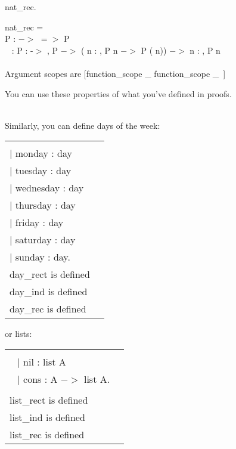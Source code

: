 \begin{code}	 nat\_rec.		\end{code}
\begin{msg}	
	nat\_rec = 								\\
	 P :  $->$  $=>$  P				\\ \-\ \qquad
		:  P :  -$>$ ,					
		  P  $->$						
       			( n : , P n $->$ P ( n)) $->$  n : , P n 
	\\ \\
	Argument scopes are [function\_scope \_ function\_scope \_\ ]
\end{msg}

\noindent
You can use these properties of what you've defined in proofs.

~\\
\noindent
Similarly, you can define days of the week:

\hspace{-1cm}
\begin{tabular}{p{8cm} p{8cm}}
\begin{code}
\Inductive \nm{day}: \Type :=	\\ \-\quad
 $\mid$ monday : day		\\ \-\quad
 $\mid$ tuesday : day		\\ \-\quad
 $\mid$ wednesday : day		\\ \-\quad
 $\mid$ thursday : day		\\ \-\quad
 $\mid$ friday : day			\\ \-\quad
 $\mid$ saturday : day		\\ \-\quad
 $\mid$ sunday : day.
\end{code}
&
\begin{msg}			
day is defined			\\
day\_rect is defined		\\
day\_ind is defined		\\
day\_rec is defined		
\end{msg}
\end{tabular}

\noindent
or lists:

\hspace{-1cm}
\begin{tabular}{p{8cm} p{8cm}}
\begin{code}
\Inductive \nm{list} (A: \ty{Set}) : \ty{Set} :=	\\ \-\ \quad
$\mid$ nil : list A						\\ \-\ \quad
$\mid$ cons : A $->$ list A.				\\
\end{code}
&
\begin{msg}
list is defined			\\
list\_rect is defined		\\
list\_ind is defined		\\
list\_rec is defined		
\end{msg}
\end{tabular}







